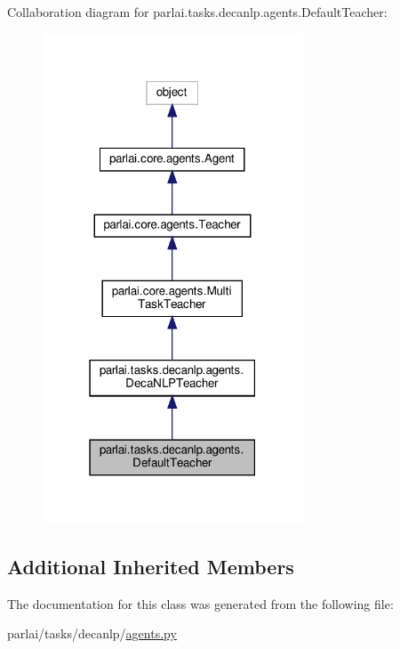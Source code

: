 Collaboration diagram for parlai.\+tasks.\+decanlp.\+agents.\+Default\+Teacher\+:
\nopagebreak
\begin{figure}[H]
\begin{center}
\leavevmode
\includegraphics[width=219pt]{classparlai_1_1tasks_1_1decanlp_1_1agents_1_1DefaultTeacher__coll__graph}
\end{center}
\end{figure}
\subsection*{Additional Inherited Members}


The documentation for this class was generated from the following file\+:\begin{DoxyCompactItemize}
\item 
parlai/tasks/decanlp/\hyperlink{parlai_2tasks_2decanlp_2agents_8py}{agents.\+py}\end{DoxyCompactItemize}
